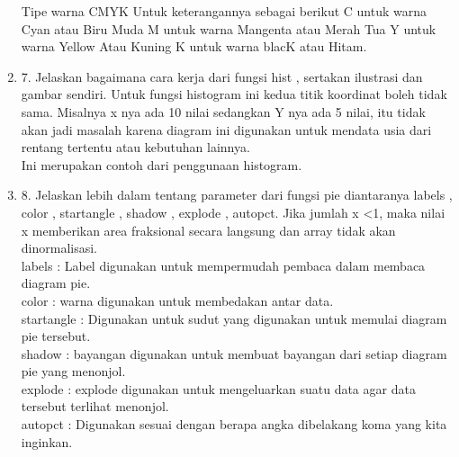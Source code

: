 \begin{enumerate}
Tipe warna CMYK
    Untuk keterangannya sebagai berikut
    C untuk warna Cyan atau Biru Muda
    M untuk warna Mangenta atau Merah Tua
    Y untuk warna Yellow Atau Kuning
    K untuk warna blacK atau Hitam.\\

\item 7. Jelaskan bagaimana cara kerja dari fungsi hist , sertakan ilustrasi dan gambar sendiri.
Untuk fungsi histogram ini kedua titik koordinat boleh tidak sama. Misalnya x nya ada 10 nilai sedangkan Y nya ada 5 nilai, itu tidak akan jadi masalah karena diagram ini digunakan untuk mendata usia dari rentang tertentu atau kebutuhan lainnya.\\

Ini merupakan contoh dari penggunaan histogram.\\

\item 8. Jelaskan lebih dalam tentang parameter dari fungsi pie diantaranya labels , color , startangle , shadow , explode , autopct.
Jika jumlah x <1, maka nilai x memberikan area fraksional secara langsung dan array tidak akan dinormalisasi.\\

labels : Label digunakan untuk mempermudah pembaca dalam membaca diagram pie.\\

color : warna digunakan untuk membedakan antar data.\\

startangle : Digunakan untuk sudut yang digunakan untuk memulai diagram pie tersebut.\\

shadow :  bayangan digunakan untuk membuat bayangan dari setiap diagram pie yang menonjol.\\

explode : explode digunakan untuk mengeluarkan suatu data agar data tersebut terlihat menonjol.\\

autopct : Digunakan sesuai dengan berapa angka dibelakang koma yang kita inginkan.\\
\end{enumerate}
